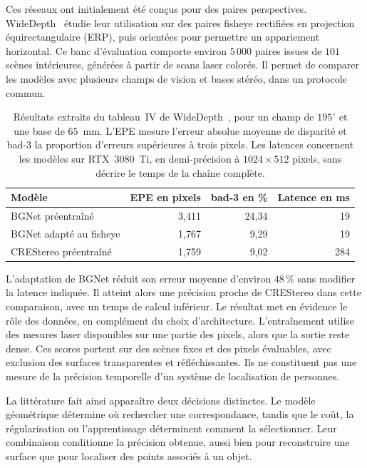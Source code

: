 \documentclass[11pt,a4paper]{article}
\begin{document}
Ces réseaux ont initialement été conçus pour des paires perspectives. WideDepth~\cite{indyk2026} étudie leur utilisation sur des paires fisheye rectifiées en projection équirectangulaire (ERP), puis orientées pour permettre un appariement horizontal. Ce banc d'évaluation comporte environ $5\,000$ paires issues de $101$ scènes intérieures, générées à partir de scans laser colorés. Il permet de comparer les modèles avec plusieurs champs de vision et bases stéréo, dans un protocole commun.

\begin{table}[H]
\centering\small
\begin{tabular}{lrrr}
\toprule
Modèle & EPE en pixels & bad-3 en \% & Latence en ms\\
\midrule
BGNet préentraîné & 3,411 & 24,34 & 19\\
BGNet adapté au fisheye & 1,767 & 9,29 & 19\\
CREStereo préentraîné & 1,759 & 9,02 & 284\\
\bottomrule
\end{tabular}
\caption{Résultats extraits du tableau~IV de WideDepth~\cite{indyk2026}, pour un champ de $195^\circ$ et une base de $65$~mm. L'EPE mesure l'erreur absolue moyenne de disparité et bad-3 la proportion d'erreurs supérieures à trois pixels. Les latences concernent les modèles sur RTX~3080~Ti, en demi-précision à $1024\times512$ pixels, sans décrire le temps de la chaîne complète.}
\label{tab:widedepth-binoculaire}
\end{table}

L'adaptation de BGNet réduit son erreur moyenne d'environ $48\,\%$ sans modifier la latence indiquée. Il atteint alors une précision proche de CREStereo dans cette comparaison, avec un temps de calcul inférieur. Le résultat met en évidence le rôle des données, en complément du choix d'architecture. L'entraînement utilise des mesures laser disponibles sur une partie des pixels, alors que la sortie reste dense. Ces scores portent sur des scènes fixes et des pixels évaluables, avec exclusion des surfaces transparentes et réfléchissantes. Ils ne constituent pas une mesure de la précision temporelle d'un système de localisation de personnes.

La littérature fait ainsi apparaître deux décisions distinctes. Le modèle géométrique détermine où rechercher une correspondance, tandis que le coût, la régularisation ou l'apprentissage déterminent comment la sélectionner. Leur combinaison conditionne la précision obtenue, aussi bien pour reconstruire une surface que pour localiser des points associés à un objet.
\end{document}
